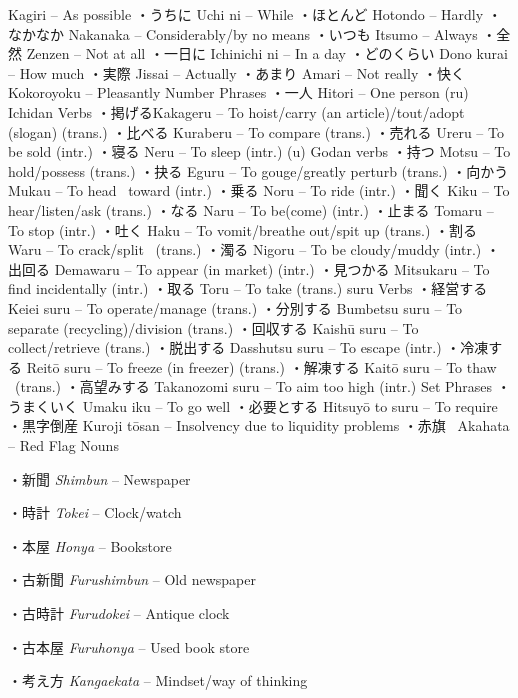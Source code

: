 Kagiri – As possible ・うちに Uchi ni – While ・ほとんど Hotondo – Hardly ・なかなか Nakanaka – Considerably\slash by no means ・いつも Itsumo – Always ・全然 Zenzen – Not at all ・一日に Ichinichi ni – In a day ・どのくらい Dono kurai – How much ・実際 Jissai – Actually ・あまり Amari – Not really ・快く Kokoroyoku – Pleasantly Number Phrases ・一人 Hitori – One person (ru) Ichidan Verbs ・掲げるKakageru – To hoist\slash carry (an article)\slash tout\slash adopt (slogan) (trans.) ・比べる Kuraberu – To compare (trans.) ・売れる Ureru – To be sold (intr.) ・寝る Neru – To sleep (intr.) (u) Godan verbs ・持つ Motsu – To hold\slash possess (trans.) ・抉る Eguru – To gouge\slash greatly perturb (trans.) ・向かう Mukau – To head  toward (intr.) ・乗る Noru – To ride (intr.) ・聞く Kiku – To hear\slash listen\slash ask (trans.) ・なる Naru – To be(come) (intr.) ・止まる Tomaru – To stop (intr.) ・吐く Haku – To vomit\slash breathe out\slash spit up (trans.) ・割る Waru – To crack\slash split  (trans.) ・濁る Nigoru – To be cloudy\slash muddy (intr.) ・出回る Demawaru – To appear (in market) (intr.) ・見つかる Mitsukaru – To find incidentally (intr.) ・取る Toru – To take (trans.) suru Verbs ・経営する Keiei suru – To operate\slash manage (trans.) ・分別する Bumbetsu suru – To separate (recycling)\slash division (trans.) ・回収する Kaishū suru – To collect\slash retrieve (trans.) ・脱出する Dasshutsu suru – To escape (intr.) ・冷凍する Reitō suru – To freeze (in freezer) (trans.) ・解凍する Kaitō suru – To thaw  (trans.) ・高望みする Takanozomi suru – To aim too high (intr.) Set Phrases ・うまくいく Umaku iku – To go well ・必要とする Hitsuyō to suru – To require ・黒字倒産 Kuroji tōsan – Insolvency due to liquidity problems ・赤旗  Akahata – Red Flag Nouns  
\par{・新聞 \emph{Shimbun }– Newspaper }
 
\par{・時計 \emph{Tokei }– Clock\slash watch }
 
\par{・本屋 \emph{Hon\textquotesingle ya }– Bookstore }
 
\par{・古新聞 \emph{Furushimbun }– Old newspaper }
 
\par{・古時計 \emph{Furudokei }– Antique clock }
 
\par{・古本屋 \emph{Furuhon\textquotesingle ya }– Used book store }
 
\par{・考え方 \emph{Kangaekata }– Mindset\slash way of thinking }
 
